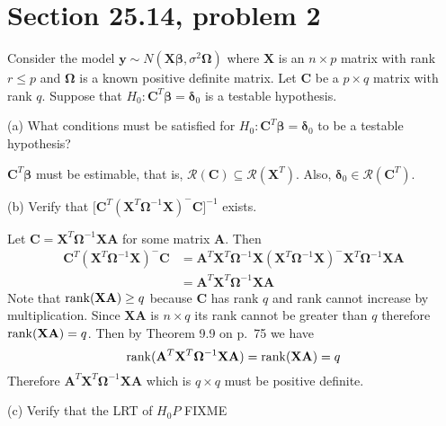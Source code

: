 
\section{Section 25.14, problem 2}
Consider the model $\mathbf y\sim N(\mathbf X\bm\beta,
\sigma^2\bm\Omega)$ where $\mathbf X$ is an $n\times p$ matrix
with rank $r\le p$ and $\bm\Omega$ is a known positive
definite matrix.
Let $\mathbf C$ be a $p\times q$ matrix with rank $q$.
Suppose that $H_0:\mathbf C^T\bm\beta=\bm\delta_0$ is a testable
hypothesis.

\bigskip
\noindent
(a) What conditions must be satisfied for
$H_0:\mathbf C^T\bm\beta=\bm\delta_0$
to be a testable hypothesis?

\bigskip
\noindent
$\mathbf C^T\bm\beta$ must be estimable, that is,
$\mathcal R(\mathbf C)\subseteq\mathcal R(\mathbf X^T)$.
Also, $\bm\delta_0\in\mathcal R(\mathbf C^T)$.

\bigskip
\noindent
(b) Verify that
$\bigg[\mathbf C^T(\mathbf X^T\bm\Omega^{-1}\mathbf X)^{-{}}
\mathbf C\bigg]^{-1}$ exists.

\bigskip
\noindent
Let $\mathbf C=\mathbf X^T\bm\Omega^{-1}\mathbf{XA}$
for some matrix $\mathbf A$.
Then
\begin{align*}
\mathbf C^T(\mathbf X^T\bm\Omega^{-1}\mathbf X)^{-{}}
\mathbf C
&=
\mathbf A^T\mathbf X^T\bm\Omega^{-1}
\mathbf X(\mathbf X^T\bm\Omega^{-1}
\mathbf X)^{-{}}\mathbf X^T\bm\Omega^{-1}\mathbf{XA}\\
&=
\mathbf A^T\mathbf X^T\bm\Omega^{-1}\mathbf X\mathbf A
\end{align*}
Note that $\mathop{\rm rank}(\mathbf{XA})\ge q$ because $\mathbf C$
has rank $q$ and rank cannot increase by multiplication.
Since $\mathbf{XA}$ is $n\times q$ its rank cannot be greater
than $q$ therefore $\mathop{\rm rank}(\mathbf{XA})=q$.
Then by Theorem 9.9 on p.\ 75 we have
\[
\mathop{\rm rank}(\mathbf A^T\mathbf X^T\bm\Omega^{-1}\mathbf X\mathbf A)
=\mathop{\rm rank}(\mathbf{XA})=q
\]
Therefore $\mathbf A^T\mathbf X^T\bm\Omega^{-1}\mathbf X\mathbf A$
which is $q\times q$ must be positive definite.

\bigskip
\noindent
(c) Verify that the LRT of $H_0P$ FIXME

